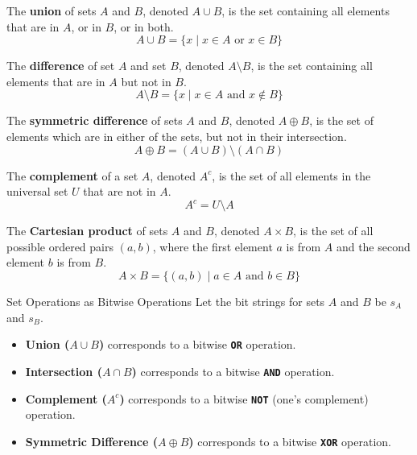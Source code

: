\begin{definition}[Union]
    The \textbf{union} of sets $A$ and $B$, denoted $A \cup B$, is the set containing all elements that are in $A$, or in $B$, or in both.
    \[ A \cup B = \{ x \mid x \in A \text{ or } x \in B \} \]
\end{definition}

\begin{definition}
    The \textbf{difference} of set $A$ and set $B$, denoted $A \setminus B$, is the set containing all elements that are in $A$ but not in $B$.
    \[ A \setminus B = \{ x \mid x \in A \text{ and } x \notin B \} \]
\end{definition}

\begin{definition}
    The \textbf{symmetric difference} of sets $A$ and $B$, denoted $A \oplus B$, is the set of elements which are in either of the sets, but not in their intersection.
    \[ A \oplus B = (A \cup B) \setminus (A \cap B) \]
\end{definition}

\begin{definition}[Complement]
    The \textbf{complement} of a set $A$, denoted $A^c$, is the set of all elements in the universal set $U$ that are not in $A$.
    \[ A^c = U \setminus A \]
\end{definition}

\begin{definition}
    The \textbf{Cartesian product} of sets $A$ and $B$, denoted $A \times B$, is the set of all possible ordered pairs $(a, b)$, where the first element $a$ is from $A$ and the second element $b$ is from $B$.
    \[ A \times B = \{ (a, b) \mid a \in A \text{ and } b \in B \} \]
\end{definition}

\begin{custombox}{Set Operations as Bitwise Operations}
    Let the bit strings for sets $A$ and $B$ be $s_A$ and $s_B$.
    \begin{itemize}
        \item \textbf{Union ($A \cup B$)} corresponds to a bitwise \textbf{\texttt{OR}} operation.
        \item \textbf{Intersection ($A \cap B$)} corresponds to a bitwise \textbf{\texttt{AND}} operation.
        \item \textbf{Complement ($A^c$)} corresponds to a bitwise \textbf{\texttt{NOT}} (one's complement) operation.
        \item \textbf{Symmetric Difference ($A \oplus B$)} corresponds to a bitwise \textbf{\texttt{XOR}} operation.
    \end{itemize}
\end{custombox}

